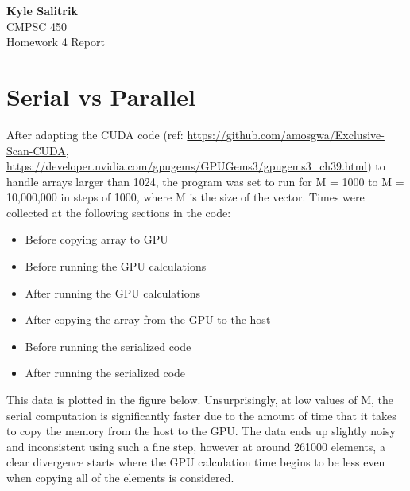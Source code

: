 \documentclass[a4paper, 11pt]{article}
\begin{document}
\graphicspath{{./figures/}}
\noindent
\large\textbf{Kyle Salitrik} \\
\normalsize CMPSC 450\\
\large{Homework 4 Report} \hfill 

\section*{Serial vs Parallel}
After adapting the CUDA code (ref: \url{https://github.com/amosgwa/Exclusive-Scan-CUDA}, \url{https://developer.nvidia.com/gpugems/GPUGems3/gpugems3_ch39.html}) to handle arrays larger than 1024, the program was set to run for M = 1000 to M = 10,000,000 in steps of 1000, where M is the size of the vector. Times were collected at the following sections in the code:
\begin{itemize}
	\item Before copying array to GPU
	\item Before running the GPU calculations
	\item After running the GPU calculations
	\item After copying the array from the GPU to the host
	\item Before running the serialized code
	\item After running the serialized code
\end{itemize}

This data is plotted in the figure below. Unsurprisingly, at low values of M, the serial computation is significantly faster due to the amount of time that it takes to copy the memory from the host to the GPU. The data ends up slightly noisy and inconsistent using such a fine step, however at around 261000 elements, a clear divergence starts where the GPU calculation time begins to be less even when copying all of the elements is considered. 
\end{document}
